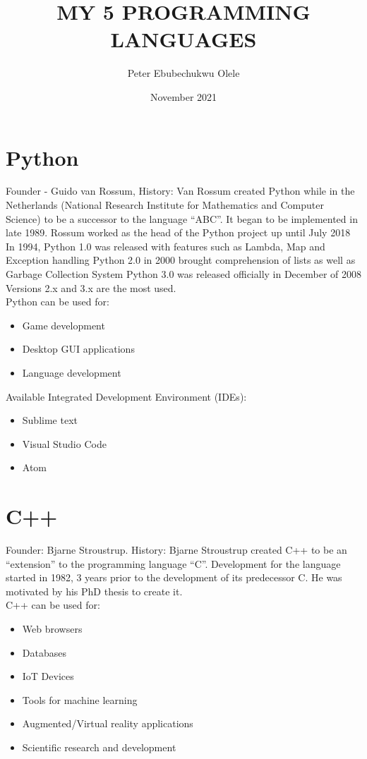 \documentclass{article}
\title{MY 5 PROGRAMMING LANGUAGES}
\date{November 2021}
\author{Peter Ebubechukwu Olele}
\begin{document}
	\section{Python}
	Founder - Guido van Rossum,
	History:
	Van Rossum created Python while in the Netherlands (National Research Institute for Mathematics and Computer Science) to be a successor to the language “ABC”. 
	It began to be implemented in late 1989. 
	Rossum worked as the head of the Python project up until July 2018
	In 1994, Python 1.0 was released with features such as Lambda, Map and Exception handling
	Python 2.0 in 2000 brought comprehension of lists as well as Garbage Collection System
	Python 3.0 was released officially in December of 2008
	Versions 2.x and 3.x are the most used.\\
	
	Python can be used for:
	\begin{itemize}
		\item Game development
		\item Desktop GUI applications
		\item Language development\\
	\end{itemize}

    Available Integrated Development Environment (IDEs):
	\begin{itemize}
	 \item Sublime text
	 \item Visual Studio Code
	 \item Atom
    \end{itemize}    
    
    
    \section{C++}
    Founder: Bjarne Stroustrup. History:
    Bjarne Stroustrup created C++ to be an “extension”  to the programming language “C”. Development for the language started in 1982, 3 years prior to the development of its predecessor C. He was motivated by his PhD thesis to create it.\\
    
    C++ can be used for:
	\begin{itemize}
	\item Web browsers
	\item Databases
	\item IoT Devices
	\item Tools for machine learning
	\item Augmented/Virtual reality applications
	\item Scientific research and development\\
	\end{itemize}  
    
\end{document}
